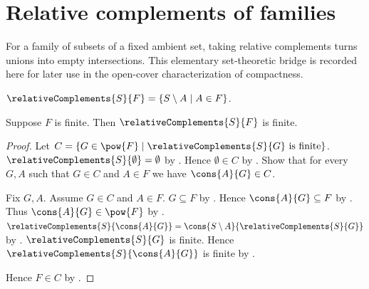 \section{Relative complements of families}



For a family of subsets of a fixed ambient set, taking relative complements
turns unions into empty intersections.  This elementary set-theoretic bridge
is recorded here for later use in the open-cover characterization of
compactness.

\begin{definition}\label{relative_complement_family}
    $\relativeComplements{S}{F}=\{S\setminus A\mid A\in F\}$.
\end{definition}

\begin{proposition}\label{relative_complement_family_finite}
    Suppose $F$ is finite.
    Then $\relativeComplements{S}{F}$ is finite.
\end{proposition}
\begin{proof}
    Let $C=\{G\in\pow{F}\mid
        \text{$\relativeComplements{S}{G}$ is finite}\}$.
    $\relativeComplements{S}{\emptyset}=\emptyset$
        by .
    Hence $\emptyset\in C$
        by .
    Show that for every $G,A$ such that $G\in C$ and $A\in F$ we have
        $\cons{A}{G}\in C$.
    \begin{subproof}
        Fix $G,A$.
        Assume $G\in C$ and $A\in F$.
        $G\subseteq F$ by .
        Hence $\cons{A}{G}\subseteq F$
            by .
        Thus $\cons{A}{G}\in\pow{F}$ by .
        $\relativeComplements{S}{\cons{A}{G}}
            =\cons{S\setminus A}{\relativeComplements{S}{G}}$
            by .
        $\relativeComplements{S}{G}$ is finite.
        Hence $\relativeComplements{S}{\cons{A}{G}}$ is finite
            by .
    \end{subproof}
    Hence $F\in C$ by .
\end{proof}

